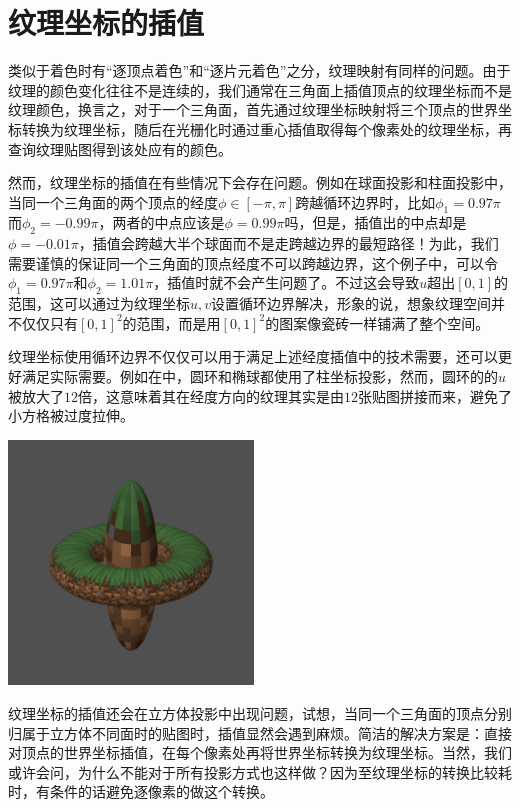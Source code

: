 \section{纹理坐标的插值}

类似于着色时有“逐顶点着色”和“逐片元着色”之分，纹理映射有同样的问题。由于纹理的颜色变化往往不是连续的，我们通常在三角面上插值顶点的纹理坐标而不是纹理颜色，换言之，对于一个三角面，首先通过纹理坐标映射将三个顶点的世界坐标转换为纹理坐标，随后在光栅化时通过重心插值取得每个像素处的纹理坐标，再查询纹理贴图得到该处应有的颜色。

然而，纹理坐标的插值在有些情况下会存在问题。例如在球面投影和柱面投影中，当同一个三角面的两个顶点的经度$\phi\in[-\pi,\pi]$跨越循环边界时，比如$\phi_1=0.97\pi$而$\phi_2=-0.99\pi$，两者的中点应该是$\phi=0.99\pi$吗，但是，插值出的中点却是$\phi=-0.01\pi$，插值会跨越大半个球面而不是走跨越边界的最短路径！为此，我们需要谨慎的保证同一个三角面的顶点经度不可以跨越边界，这个例子中，可以令$\phi_1=0.97\pi$和$\phi_2=1.01\pi$，插值时就不会产生问题了。不过这会导致$u$超出$[0,1]$的范围，这可以通过为纹理坐标$u,v$设置循环边界解决，形象的说，想象纹理空间并不仅仅只有$[0,1]^2$的范围，而是用$[0,1]^2$的图案像瓷砖一样铺满了整个空间。

纹理坐标使用循环边界不仅仅可以用于满足上述经度插值中的技术需要，还可以更好满足实际需要。例如在中，圆环和椭球都使用了柱坐标投影，然而，圆环的的$u$被放大了$12$倍，这意味着其在经度方向的纹理其实是由$12$张贴图拼接而来，避免了小方格被过度拉伸。

\begin{Figure}[纹理坐标的循环边界]
    \includegraphics[width=6.5cm]{image/RasterizationIOW/SphereRingTexture.png}
\end{Figure}

纹理坐标的插值还会在立方体投影中出现问题，试想，当同一个三角面的顶点分别归属于立方体不同面时的贴图时，插值显然会遇到麻烦。简洁的解决方案是：直接对顶点的世界坐标插值，在每个像素处再将世界坐标转换为纹理坐标。当然，我们或许会问，为什么不能对于所有投影方式也这样做？因为至纹理坐标的转换比较耗时，有条件的话避免逐像素的做这个转换。
